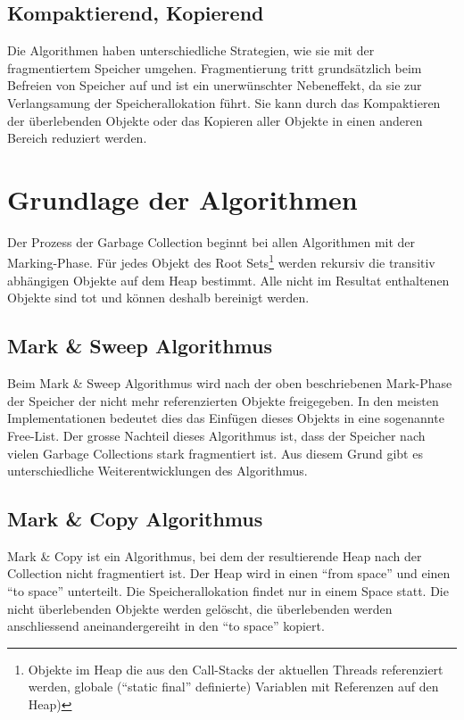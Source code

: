\subsection{Kompaktierend, Kopierend}
Die Algorithmen haben unterschiedliche Strategien, wie sie mit der fragmentiertem Speicher umgehen. Fragmentierung tritt grundsätzlich beim Befreien von Speicher auf und ist ein unerwünschter Nebeneffekt, da sie zur Verlangsamung der Speicherallokation führt. Sie kann durch das Kompaktieren der überlebenden Objekte oder das Kopieren aller Objekte in einen anderen Bereich reduziert werden.

\section{Grundlage der Algorithmen}
Der Prozess der Garbage Collection beginnt bei allen Algorithmen mit der Marking-Phase. Für jedes Objekt des Root Sets\footnote{Objekte im Heap die aus den Call-Stacks der aktuellen Threads referenziert werden, globale (``static final'' definierte) Variablen mit Referenzen auf den Heap)} werden rekursiv die transitiv abhängigen Objekte auf dem Heap bestimmt. Alle nicht im Resultat enthaltenen Objekte sind tot und können deshalb bereinigt werden.

\subsection{Mark \& Sweep Algorithmus}
Beim Mark \& Sweep Algorithmus wird nach der oben beschriebenen Mark-Phase der Speicher der nicht mehr referenzierten Objekte freigegeben. In den meisten Implementationen bedeutet dies das Einfügen dieses Objekts in eine sogenannte Free-List. Der grosse Nachteil dieses Algorithmus ist, dass der Speicher nach vielen Garbage Collections stark fragmentiert ist. Aus diesem Grund gibt es unterschiedliche Weiterentwicklungen des Algorithmus.

\subsection{Mark \& Copy Algorithmus}
Mark \& Copy ist ein Algorithmus, bei dem der resultierende Heap nach der Collection nicht fragmentiert ist. Der Heap wird in einen ``from space'' und einen ``to space'' unterteilt. Die Speicherallokation findet nur in einem Space statt. Die nicht überlebenden Objekte werden gelöscht, die überlebenden werden anschliessend aneinandergereiht in den ``to space'' kopiert.

